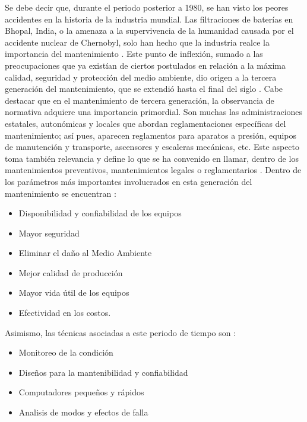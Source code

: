 Se debe decir que, durante el periodo posterior a 1980, se han visto los peores accidentes en la historia de la industria mundial. Las filtraciones de baterías en Bhopal, India, o  la amenaza a la supervivencia de la humanidad causada por el accidente nuclear de Chernobyl, solo han hecho que la industria realce la importancia del mantenimiento \parencite{shenoy2005}. Este punto de inflexión, sumado a las preocupaciones que ya existían de ciertos postulados en relación a la máxima calidad, seguridad y protección del medio ambiente, dio origen a la tercera generación del mantenimiento, que se extendió hasta el final del siglo \parencite{garcia2012}. Cabe destacar que en el mantenimiento de tercera generación, la observancia de normativa adquiere una importancia primordial. Son muchas las administraciones estatales, autonómicas y locales que abordan reglamentaciones específicas del mantenimiento; así pues, aparecen reglamentos para aparatos a presión, equipos de manutención y transporte, ascensores y escaleras mecánicas, etc. Este aspecto toma también relevancia y define lo que se ha convenido en llamar, dentro de los mantenimientos preventivos, mantenimientos legales o reglamentarios \parencite{gonzalez2005}. Dentro de los parámetros más importantes involucrados en esta generación del mantenimiento se encuentran \parencite{louis2012}:

\begin{itemize}
\item Disponibilidad y confiabilidad de los equipos
\item Mayor seguridad
\item Eliminar el daño al Medio Ambiente
\item Mejor calidad de producción
\item Mayor vida útil de los equipos
\item Efectividad en los costos.
\end{itemize}

Asimismo, las técnicas asociadas a este periodo de tiempo son \parencite{louis2012}:\\

\begin{itemize}
\item Monitoreo de la condición
\item Diseños para la mantenibilidad y confiabilidad
\item Computadores pequeños y rápidos
\item Analisis de modos y efectos de falla
\end{itemize}     

